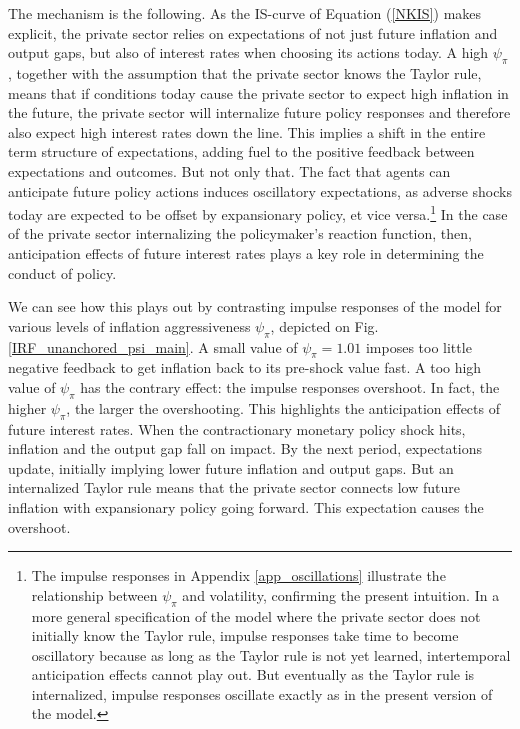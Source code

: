 \documentclass[11pt]{article}
\renewcommand{\[}{\begin{equation}}
\renewcommand{\]}{\end{equation}}
\begin{document}
The mechanism is the following. As the IS-curve of Equation (\ref{NKIS}) makes explicit, the private sector relies on expectations of not just future inflation and output gaps, but also of interest rates when choosing its actions today. A high $\psi_{\pi}$, together with the assumption that the private sector knows the Taylor rule, means that if conditions today cause the private sector to expect high inflation in the future, the private sector will internalize future policy responses and therefore also expect high interest rates down the line. This implies a shift in the entire term structure of expectations, adding fuel to the positive feedback between expectations and outcomes. But not only that. The fact that agents can anticipate future policy actions induces oscillatory expectations, as adverse shocks today are expected to be offset by expansionary policy, et vice versa.\footnote{The impulse responses in Appendix \ref{app_oscillations} illustrate the relationship between $\psi_{\pi}$ and volatility, confirming the present intuition. In a more general specification of the model where the private sector does not initially know the Taylor rule, impulse responses take time to become oscillatory because as long as the Taylor rule is not yet learned, intertemporal anticipation effects cannot play out. But eventually as the Taylor rule is internalized, impulse responses oscillate exactly as in the present version of the model.} In the case of the private sector internalizing the policymaker's reaction function, then, anticipation effects of future interest rates plays a key role in determining the conduct of policy.

We can see how this plays out by contrasting impulse responses of the model for various levels of inflation aggressiveness $\psi_{\pi}$, depicted on Fig. \ref{IRF_unanchored_psi_main}. A small value of $\psi_{\pi} = 1.01$ imposes too little negative feedback to get inflation back to its pre-shock value fast. A too high value of $\psi_{\pi}$ has the contrary effect: the impulse responses overshoot. In fact, the higher $\psi_{\pi}$, the larger the overshooting. This highlights the anticipation effects of future interest rates. When the contractionary monetary policy shock hits, inflation and the output gap fall on impact. By the next period, expectations update, initially implying lower future inflation and output gaps. But an internalized Taylor rule means that the private sector connects low future inflation with expansionary policy going forward. This expectation causes the overshoot.
\end{document}
